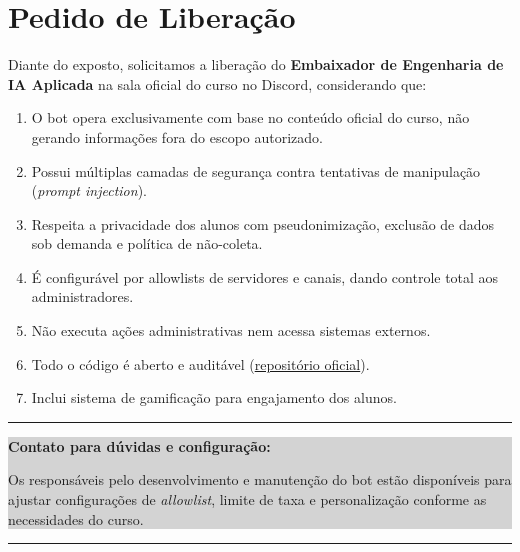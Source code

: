 \documentclass[11pt,a4paper]{article}
\newcommand{\boxedinfo}[1]{%
  \vspace{0.8em}\noindent
  {\color{primary!20}\rule{\textwidth}{0.5pt}}\par\nopagebreak
  \vspace{0.3em}\noindent\colorbox{lightgray}{%
    \parbox{\dimexpr\textwidth-2\fboxsep\relax}{%
      \vspace{0.4em}\hspace{0.5em}#1\hspace{0.5em}\vspace{0.4em}%
    }%
  }\par\nopagebreak
  \vspace{0.3em}\noindent
  {\color{primary!20}\rule{\textwidth}{0.5pt}}\vspace{0.8em}%
}
\begin{document}
\section{Pedido de Liberação}

Diante do exposto, solicitamos a liberação do \textbf{Embaixador de Engenharia de IA Aplicada} na sala oficial do curso no Discord, considerando que:

\begin{enumerate}[leftmargin=1.5em, itemsep=0.3em]
  \item O bot opera exclusivamente com base no conteúdo oficial do curso, não gerando informações fora do escopo autorizado.
  \item Possui múltiplas camadas de segurança contra tentativas de manipulação (\textit{prompt injection}).
  \item Respeita a privacidade dos alunos com pseudonimização, exclusão de dados sob demanda e política de não-coleta.
  \item É configurável por allowlists de servidores e canais, dando controle total aos administradores.
  \item Não executa ações administrativas nem acessa sistemas externos.
  \item Todo o código é aberto e auditável (\href{https://github.com/lsilveirab39/bot-embaixador}{repositório oficial}).
  \item Inclui sistema de gamificação para engajamento dos alunos.
\end{enumerate}

\boxedinfo{%
\textbf{Contato para dúvidas e configuração:}\par
\vspace{0.3em}
Os responsáveis pelo desenvolvimento e manutenção do bot estão disponíveis para ajustar configurações de \textit{allowlist}, limite de taxa e personalização conforme as necessidades do curso.
}

\vspace{2cm}
\begin{flushright}
\end{flushright}
\end{document}
